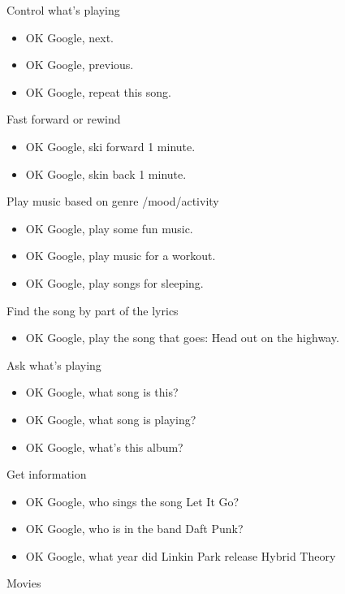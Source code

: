 \documentclass[
  letterpaper,
  DIV=11,
  numbers=noendperiod]{scrartcl}
\providecommand{\tightlist}{%
  \setlength{\itemsep}{0pt}\setlength{\parskip}{0pt}}\usepackage{longtable,booktabs,array}
\begin{document}
Control what's playing

\begin{itemize}
\item
  OK Google, next.
\item
  OK Google, previous.
\item
  OK Google, repeat this song.
\end{itemize}

Fast forward or rewind

\begin{itemize}
\item
  OK Google, ski forward 1 minute.
\item
  OK Google, skin back 1 minute.
\end{itemize}

Play music based on genre /mood/activity

\begin{itemize}
\item
  OK Google, play some fun music.
\item
  OK Google, play music for a workout.
\item
  OK Google, play songs for sleeping.
\end{itemize}

Find the song by part of the lyrics

\begin{itemize}
\tightlist
\item
  OK Google, play the song that goes: Head out on the highway.
\end{itemize}

Ask what's playing

\begin{itemize}
\item
  OK Google, what song is this?
\item
  OK Google, what song is playing?
\item
  OK Google, what's this album?
\end{itemize}

Get information

\begin{itemize}
\item
  OK Google, who sings the song Let It Go?
\item
  OK Google, who is in the band Daft Punk?
\item
  OK Google, what year did Linkin Park release Hybrid Theory
\end{itemize}

Movies
\end{document}
